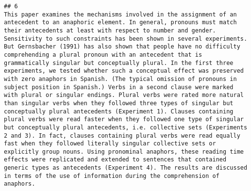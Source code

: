 \documentclass[
  english,
  man]{apa6}
\begin{document}
\begin{verbatim}
## 6                                                                                                                                                                                                                                                                                                                                                                                                                                                                                                                                                                                                                                                                                                                                                                                                                                                                                                                                                                                                                                                                                                                                                                                             This paper examines the mechanisms involved in the assignment of an antecedent to an anaphoric element. In general, pronouns must match their antecedents at least with respect to number and gender. Sensitivity to such constraints has been shown in several experiments. But Gernsbacher (1991) has also shown that people have no difficulty comprehending a plural pronoun with an antecedent that is grammatically singular but conceptually plural. In the first three experiments, we tested whether such a conceptual effect was preserved with zero anaphors in Spanish. (The typical omission of pronouns in subject position in Spanish.) Verbs in a second clause were marked with plural or singular endings. Plural verbs were rated more natural than singular verbs when they followed three types of singular but conceptually plural antecedents (Experiment 1). Clauses containing plural verbs were read faster when they followed one type of singular but conceptually plural antecedents, i.e. collective sets (Experiments 2 and 3). In fact, clauses containing plural verbs were read equally fast when they followed literally singular collective sets or explicitly group nouns. Using pronominal anaphors, these reading time effects were replicated and extended to sentences that contained generic types as antecedents (Experiment 4). The results are discussed in terms of the use of information during the comprehension of anaphors.

\end{verbatim}
\end{document}

